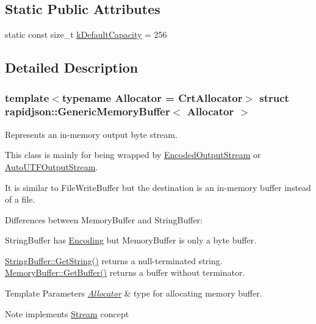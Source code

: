\subsection*{Static Public Attributes}
\begin{DoxyCompactItemize}
\item 
static const size\+\_\+t \mbox{\hyperlink{structrapidjson_1_1_generic_memory_buffer_abaa207fb3f94da48b0c91755828f98b3}{k\+Default\+Capacity}} = 256
\end{DoxyCompactItemize}


\subsection{Detailed Description}
\subsubsection*{template$<$typename Allocator = Crt\+Allocator$>$\newline
struct rapidjson\+::\+Generic\+Memory\+Buffer$<$ Allocator $>$}

Represents an in-\/memory output byte stream. 

This class is mainly for being wrapped by \mbox{\hyperlink{classrapidjson_1_1_encoded_output_stream}{Encoded\+Output\+Stream}} or \mbox{\hyperlink{classrapidjson_1_1_auto_u_t_f_output_stream}{Auto\+U\+T\+F\+Output\+Stream}}.

It is similar to File\+Write\+Buffer but the destination is an in-\/memory buffer instead of a file.

Differences between Memory\+Buffer and String\+Buffer\+:
\begin{DoxyEnumerate}
\item String\+Buffer has \mbox{\hyperlink{classrapidjson_1_1_encoding}{Encoding}} but Memory\+Buffer is only a byte buffer.
\item \mbox{\hyperlink{classrapidjson_1_1_generic_string_buffer_a520c0f75424762ea44ebf6ecdd1931d8}{String\+Buffer\+::\+Get\+String()}} returns a null-\/terminated string. \mbox{\hyperlink{structrapidjson_1_1_generic_memory_buffer_a2c05ddb3b37a57fc941d7b377e95b67a}{Memory\+Buffer\+::\+Get\+Buffer()}} returns a buffer without terminator.
\end{DoxyEnumerate}


\begin{DoxyTemplParams}{Template Parameters}
{\em \mbox{\hyperlink{classrapidjson_1_1_allocator}{Allocator}}} & type for allocating memory buffer. \\
\hline
\end{DoxyTemplParams}
\begin{DoxyNote}{Note}
implements \mbox{\hyperlink{classrapidjson_1_1_stream}{Stream}} concept 
\end{DoxyNote}


